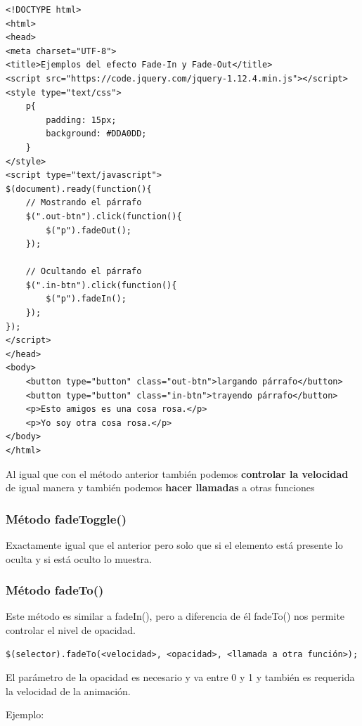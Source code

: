 \documentclass[a4paper, oneside]{article}
\begin{document}
\begin{verbatim}
<!DOCTYPE html>
<html>
<head>
<meta charset="UTF-8">
<title>Ejemplos del efecto Fade-In y Fade-Out</title>
<script src="https://code.jquery.com/jquery-1.12.4.min.js"></script>
<style type="text/css">
    p{
        padding: 15px;
        background: #DDA0DD;
    }
</style>
<script type="text/javascript">
$(document).ready(function(){
    // Mostrando el párrafo
    $(".out-btn").click(function(){
        $("p").fadeOut();
    });

    // Ocultando el párrafo
    $(".in-btn").click(function(){
        $("p").fadeIn();
    });
});
</script>
</head>
<body>
    <button type="button" class="out-btn">largando párrafo</button>
    <button type="button" class="in-btn">trayendo párrafo</button>
    <p>Esto amigos es una cosa rosa.</p>
    <p>Yo soy otra cosa rosa.</p>
</body>
</html>                                		                                		
\end{verbatim}

Al igual que con el método anterior también podemos \textbf{controlar la velocidad} de igual manera y también podemos \textbf{hacer llamadas} a otras funciones

\subsubsection{Método fadeToggle()}
\label{sec:org5377581}

Exactamente igual que el anterior pero solo que si el elemento está presente lo oculta y si está oculto lo muestra.

\subsubsection{Método fadeTo()}
\label{sec:orgb1a69ef}

Este método es similar a fadeIn(), pero a diferencia de él fadeTo() nos permite controlar el nivel de opacidad. 

\begin{verbatim}
$(selector).fadeTo(<velocidad>, <opacidad>, <llamada a otra función>);
\end{verbatim}

El parámetro de la opacidad es necesario y va entre 0  y 1 y también es requerida la velocidad de la animación.

Ejemplo:
\end{document}
